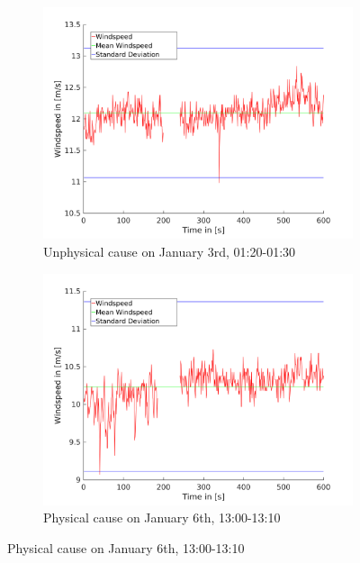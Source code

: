 \documentclass[10pt]{article}
\begin{document}
\begin{figure}[htb!]
\begin{subfigure}{0.5\textwidth}
  \centering
  \includegraphics[width=1\linewidth]{../Plots/spikesintervall440.png}
  \caption{Unphysical cause on January 3rd, 01:20-01:30}
  \label{fig:spikeUnphys}
\end{subfigure}
\begin{subfigure}{0.5\textwidth}
  \centering
  \includegraphics[width=1\linewidth]{../Plots/spikesintervall942.png}
  \caption{Physical cause on January 6th, 13:00-13:10}
    \label{fig:spikePhys}
\end{subfigure}
\end{figure}
\end{document}
